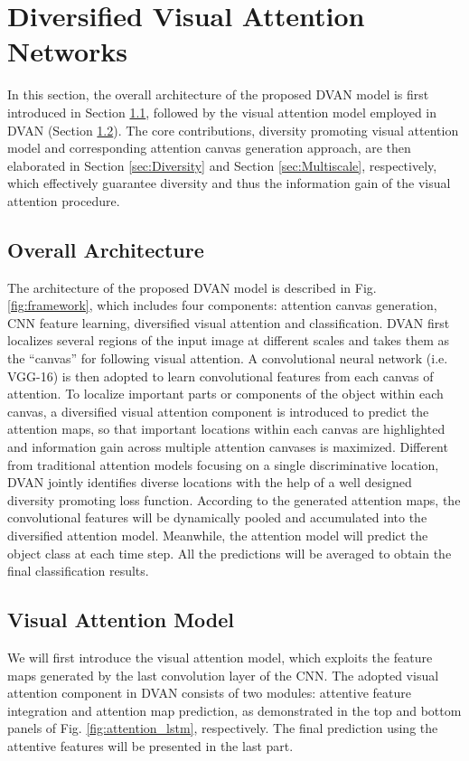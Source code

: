 \documentclass[journal]{IEEEtran}
\begin{document}
\section{Diversified Visual Attention Networks}
\label{sec:methods}
In this section, the overall architecture of the proposed DVAN model is first introduced in Section \ref{sec:Arch}, followed by the visual attention model employed in DVAN (Section \ref{sec:VAM}). The core contributions, diversity promoting visual attention model and corresponding attention canvas generation approach, are then elaborated in Section \ref{sec:Diversity} and Section \ref{sec:Multiscale}, respectively, which effectively guarantee diversity and thus the information gain of the visual attention procedure.

\subsection{Overall Architecture}
\label{sec:Arch}
The architecture of the proposed DVAN model is described in Fig. \ref{fig:framework}, which includes four components: attention canvas generation, CNN feature learning, diversified visual attention and classification. DVAN first localizes several regions of the input image at different scales and takes them as the ``canvas'' for following visual attention. A convolutional neural network (i.e. VGG-16) is then adopted to learn convolutional features from each canvas of attention. To localize important parts or components of the object within each canvas, a diversified visual attention component is introduced to predict the attention maps, so that important locations within each canvas are highlighted and information gain across multiple attention canvases is maximized. Different from traditional attention models focusing on a single discriminative location, DVAN jointly identifies diverse locations with the help of a well designed diversity promoting loss function. According to the generated attention maps, the convolutional features will be dynamically pooled and accumulated into the diversified attention model. Meanwhile, the attention model will predict the object class at each time step. All the predictions will be averaged to obtain the final classification results.

\subsection{Visual Attention Model}
\label{sec:VAM}
We will first introduce the visual attention model, which exploits the feature maps generated by the last convolution layer of the CNN. The adopted visual attention component in DVAN consists of two modules: attentive feature integration and attention map prediction, as demonstrated in the top and bottom panels of Fig. \ref{fig:attention_lstm}, respectively. The final prediction using the attentive features will be presented in the last part.
\end{document}
